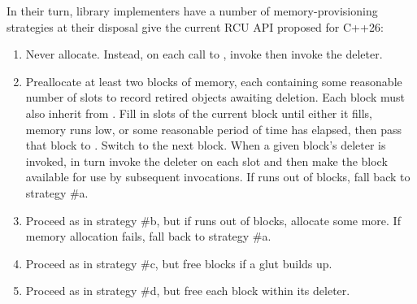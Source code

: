 \begin{enumerate}
	In their turn, library implementers have a number of
	 memory-provisioning strategies at their
	disposal give the current RCU API proposed for C++26:

	\begin{enumerate}
	\item	Never allocate.
		Instead, on each call to , invoke
		 then invoke the deleter.
	\item	Preallocate at least two blocks of memory, each containing
		some reasonable number of slots to record retired objects
		awaiting deletion.
		Each block must also inherit from .
		Fill in slots of the current block until either it fills,
		memory runs low, or some reasonable period of time has
		elapsed, then pass that block to .
		Switch to the next block.
		When a given block's deleter is invoked, in turn invoke
		the deleter on each slot and then make the block available
		for use by subsequent  invocations.
		If  runs out of blocks, fall back
		to strategy \#a.
	\item	Proceed as in strategy \#b, but if 
		runs out of blocks, allocate some more.
		If memory allocation fails, fall back to strategy \#a.
	\item	Proceed as in strategy \#c, but free blocks if a glut
		builds up.
	\item	Proceed as in strategy \#d, but free each block within
		its deleter.
	\end{enumerate}


\end{enumerate}
